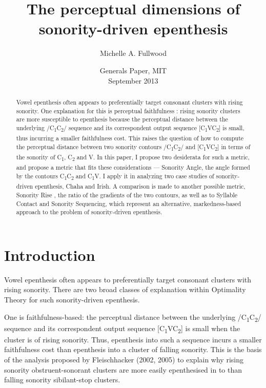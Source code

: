 \documentclass[12pt]{article}
\title{The perceptual dimensions of \\ sonority-driven epenthesis}
\author{Michelle A. Fullwood}
\date{Generals Paper, MIT \\ September 2013}
\begin{document}
\maketitle

\begin{abstract}
 
Vowel epenthesis often appears to preferentially target consonant clusters with rising sonority.
One explanation for this is perceptual faithfulness \citep{fleischhacker.2002,steriade.2006}: rising sonority clusters are more susceptible to epenthesis because the perceptual distance between the underlying /C\textsubscript{1}C\textsubscript{2}/ sequence and its correspondent output sequence [C\textsubscript{1}VC\textsubscript{2}] is small, thus incurring a smaller faithfulness cost.
This raises the question of how to compute the perceptual distance between two sonority contours /C\textsubscript{1}C\textsubscript{2}/ and [C\textsubscript{1}VC\textsubscript{2}] in terms of the sonority of C\textsubscript{1}, C\textsubscript{2} and V.  
In this paper, I propose two desiderata for such a metric, and propose a metric that fits these considerations --- {\sc Sonority Angle}, the angle formed by the contours C\textsubscript{1}C\textsubscript{2} and C\textsubscript{1}V. I apply it in analyzing two case studies of sonority-driven epenthesis, Chaha and Irish.  A comparison is made to another possible metric,
{\sc Sonority Rise} \citep{flemming.2008}, the ratio of the gradients of the two contours, as well as to Syllable Contact and Sonority Sequencing, which represent an alternative, markedness-based approach to the problem of sonority-driven epenthesis. 
\end{abstract}

\newpage
\tableofcontents
\newpage

\section{Introduction}

Vowel epenthesis often appears to preferentially target consonant clusters with rising sonority.
There are two broad classes of explanation within Optimality Theory for such sonority-driven epenthesis.

One is faithfulness-based: the perceptual distance between the underlying /C\textsubscript{1}C\textsubscript{2}/ sequence and its correspondent
output sequence [C\textsubscript{1}VC\textsubscript{2}] is small when the cluster is of rising sonority.
Thus, epenthesis into such a sequence incurs a smaller faithfulness cost than epenthesis into a cluster of falling sonority. This is the basis of the analysis proposed by Fleischhacker (2002, 2005) to explain why rising sonority obstruent-sonorant clusters are more easily epenthesised in
to than falling sonority sibilant-stop clusters.
\end{document}

